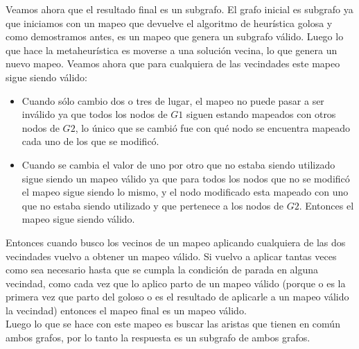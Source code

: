 \noindent Veamos ahora que el resultado final es un subgrafo. El grafo inicial es subgrafo ya que iniciamos con un mapeo que devuelve el algoritmo de heurística golosa y como demostramos antes, es un mapeo que genera un subgrafo válido. Luego lo que hace la metaheurística es moverse a una solución vecina, lo que genera un nuevo mapeo. Veamos ahora que para cualquiera de las vecindades este mapeo sigue siendo válido: 
\begin{itemize}
	\item Cuando sólo cambio dos o tres de lugar, el mapeo no puede pasar a ser inválido ya que todos los nodos de $G1$ siguen estando mapeados con otros nodos de $G2$, lo único que se cambió fue con qué nodo se encuentra mapeado cada uno de los que se modificó.
    \item Cuando se cambia el valor de uno por otro que no estaba siendo utilizado sigue siendo un mapeo válido ya que para todos los nodos que no se modificó el mapeo sigue siendo lo mismo, y el nodo modificado esta mapeado con uno que no estaba siendo utilizado y que pertenece a los nodos de $G2$. Entonces el mapeo sigue siendo válido. 
\end{itemize}
Entonces cuando busco los vecinos de un mapeo aplicando cualquiera de las dos vecindades vuelvo a obtener un mapeo válido. Si vuelvo a aplicar tantas veces como sea necesario hasta que se cumpla la condición de parada en alguna vecindad, como cada vez que lo aplico parto de un mapeo válido (porque o es la primera vez que parto del goloso o es el resultado de aplicarle a un mapeo válido la vecindad) entonces el mapeo final es un mapeo válido. \\
Luego lo que se hace con este mapeo es buscar las aristas que tienen en común ambos grafos, por lo tanto la respuesta es un subgrafo de ambos grafos. 


